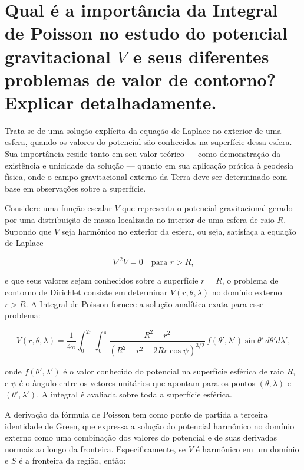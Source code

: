 
\section{Qual é a importância da Integral de Poisson no estudo do potencial gravitacional $V$ e seus diferentes problemas de valor de contorno? Explicar detalhadamente.}

Trata-se de uma solução explícita da equação de Laplace no exterior de uma esfera, quando os valores do potencial são conhecidos na superfície dessa esfera. Sua importância reside tanto em seu valor teórico — como demonstração da existência e unicidade da solução — quanto em sua aplicação prática à geodesia física, onde o campo gravitacional externo da Terra deve ser determinado com base em observações sobre a superfície.

Considere uma função escalar \( V \) que representa o potencial gravitacional gerado por uma distribuição de massa localizada no interior de uma esfera de raio \( R \). Supondo que \( V \) seja harmônico no exterior da esfera, ou seja, satisfaça a equação de Laplace

\[
\nabla^2 V = 0 \quad \text{para } r > R \text{,}
\]

e que seus valores sejam conhecidos sobre a superfície \( r = R \), o problema de contorno de Dirichlet consiste em determinar \( V(r, \theta, \lambda) \) no domínio externo \( r > R \). A Integral de Poisson fornece a solução analítica exata para esse problema:

\[
V(r, \theta, \lambda) = \frac{1}{4\pi} \int_0^{2\pi} \int_0^\pi \frac{R^2 - r^2}{(R^2 + r^2 - 2Rr \cos \psi)^{3/2}} \, f(\theta', \lambda') \sin \theta' \, d\theta' d\lambda' \text{,}
\]

onde \( f(\theta', \lambda') \) é o valor conhecido do potencial na superfície esférica de raio \( R \), e \( \psi \) é o ângulo entre os vetores unitários que apontam para os pontos \( (\theta, \lambda) \) e \( (\theta', \lambda') \). A integral é avaliada sobre toda a superfície esférica.

A derivação da fórmula de Poisson tem como ponto de partida a terceira identidade de Green, que expressa a solução do potencial harmônico no domínio externo como uma combinação dos valores do potencial e de suas derivadas normais ao longo da fronteira. Especificamente, se \( V \) é harmônico em um domínio e \( S \) é a fronteira da região, então:

